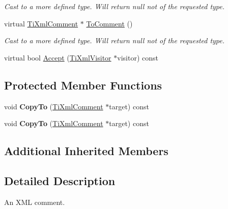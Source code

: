 \begin{DoxyCompactItemize}
\begin{DoxyCompactList}\small\item\em Cast to a more defined type. Will return null not of the requested type. \end{DoxyCompactList}\item 
\hypertarget{class_ti_xml_comment_acc7c7e07e13c23f17797d642981511df}{virtual \hyperlink{class_ti_xml_comment}{Ti\+Xml\+Comment} $\ast$ \hyperlink{class_ti_xml_comment_acc7c7e07e13c23f17797d642981511df}{To\+Comment} ()}\label{class_ti_xml_comment_acc7c7e07e13c23f17797d642981511df}

\begin{DoxyCompactList}\small\item\em Cast to a more defined type. Will return null not of the requested type. \end{DoxyCompactList}\item 
virtual bool \hyperlink{class_ti_xml_comment_af3ac1b99fbbe9ea4fb6e14146156e43e}{Accept} (\hyperlink{class_ti_xml_visitor}{Ti\+Xml\+Visitor} $\ast$visitor) const 
\end{DoxyCompactItemize}
\subsection*{Protected Member Functions}
\begin{DoxyCompactItemize}
\item 
\hypertarget{class_ti_xml_comment_a3175b2f27628f4fb7a043897930cd934}{void {\bfseries Copy\+To} (\hyperlink{class_ti_xml_comment}{Ti\+Xml\+Comment} $\ast$target) const }\label{class_ti_xml_comment_a3175b2f27628f4fb7a043897930cd934}

\item 
\hypertarget{class_ti_xml_comment_a3175b2f27628f4fb7a043897930cd934}{void {\bfseries Copy\+To} (\hyperlink{class_ti_xml_comment}{Ti\+Xml\+Comment} $\ast$target) const }\label{class_ti_xml_comment_a3175b2f27628f4fb7a043897930cd934}

\end{DoxyCompactItemize}
\subsection*{Additional Inherited Members}


\subsection{Detailed Description}
An X\+M\+L comment. 

